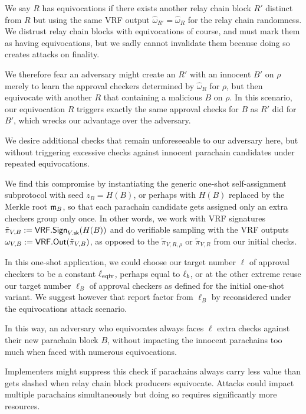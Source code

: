 We say $R$ has equivocations if there exists another relay chain block $R'$ distinct from $R$ but using the same VRF output $\hat{\omega}_{R'} = \hat{\omega}_R$ for the relay chain randomness.  We distrust relay chain blocks with equivocations of course, and must mark them as having equivocations, but we sadly cannot invalidate them because doing so creates attacks on finality. 

We therefore fear an adversary might create an $R'$ with an innocent $B'$ on $\rho$ merely to learn the approval checkers determined by $\hat{\omega}_R$ for $\rho$, but then equivocate with another $R$ that containing a malicious $B$ on $\rho$.  In this scenario, our equivocation $R$ triggers exactly the same approval checks for $B$ as $R'$ did for $B'$, which wrecks our advantage over the adversary.

We desire additional checks that remain unforeseeable to our adversary here, but without triggering excessive checks against innocent parachain candidates under repeated equivocations.     

We find this compromise by instantiating the generic one-shot self-assignment subprotocol with seed $z_B = H(B)$, or perhaps with $H(B)$ replaced by the Merkle root $\mathfrak{m}_B$, so that each parachain candidate gets assigned only an extra checkers group only once.  In other words, we work with VRF signatures $\tilde{\pi}_{V,B} := \mathsf{VRF}.\mathsf{Sign}_{V.\mathsf{sk}}(H(B))$ and do verifiable sampling with the VRF outputs $\omega_{V,B} := \mathsf{VRF}.\mathsf{Out}(\tilde{\pi}_{V,B})$, as opposed to the $\tilde{\pi}_{V,R,\rho}$ or $\tilde{\pi}_{V,R}$ from our initial checks.

In this one-shot application, we could choose our target number $\ell$ of approval checkers to be a constant $\ell_{\mathrm{eqiv}}$, perhaps equal to $\ell_b$, or at the other extreme reuse our target number $\ell_B$ of approval checkers as defined for the initial one-shot variant.  We suggest however that report factor from $\ell_B$ by reconsidered under the equivocations attack scenario.

In this way, an adversary who equivocates always faces $\ell$ extra checks against their new parachain block $B$, without impacting the innocent parachains too much when faced with numerous equivocations.

Implementers might suppress this check if parachains always carry less value than gets slashed when relay chain block producers equivocate.  Attacks could impact multiple parachains simultaneously but doing so requires significantly more resources.

